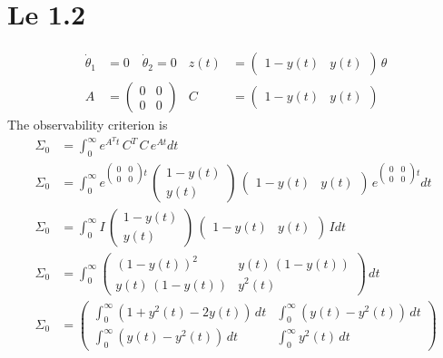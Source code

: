 \section{Le 1.2}
\begin{align*}
    \dot \theta_1 &= 0 \quad \dot \theta_2 = 0 & z(t) &= \begin{pmatrix}
        1-y(t) & y(t)
    \end{pmatrix}\,\theta \\
    A &= \begin{pmatrix}
        0 & 0 \\
        0 & 0
    \end{pmatrix} & C &= \begin{pmatrix}
        1-y(t) & y(t)
    \end{pmatrix}
\end{align*}
The observability criterion is 
\begin{align*}
    \Sigma_0 &= \int_{0}^{\infty} e^{A^Tt}\,C^T\,C\,e^{At} dt \\
    \Sigma_0 &= \int_{0}^{\infty} e^{\begin{pmatrix} 0 & 0 \\ 0 & 0\end{pmatrix}t}\, \begin{pmatrix} 1-y(t) \\ y(t) \end{pmatrix}\,\begin{pmatrix} 1-y(t) & y(t) \end{pmatrix}\,e^{\begin{pmatrix} 0 & 0 \\ 0 & 0\end{pmatrix}t} dt \\
    \Sigma_0 &= \int_{0}^{\infty} I\, \begin{pmatrix} 1-y(t) \\ y(t) \end{pmatrix}\,\begin{pmatrix} 1-y(t) & y(t) \end{pmatrix}\,I dt \\
    \Sigma_0 &= \int_{0}^{\infty} \begin{pmatrix} \left(1-y(t)\right)^2 & y(t)\,\left(1-y(t)\right)\\ y(t)\,\left(1-y(t)\right) & y^2(t) \end{pmatrix}\,dt \\
    \Sigma_0 &= \begin{pmatrix} \int_{0}^{\infty} \left(1+y^2(t)-2y(t)\right)\,dt & \int_{0}^{\infty} \left(y(t)-y^2(t)\right)\,dt\\ \int_{0}^{\infty} \left(y(t)-y^2(t)\right)\,dt & \int_{0}^{\infty} y^2(t)\,dt \end{pmatrix}
\end{align*}
